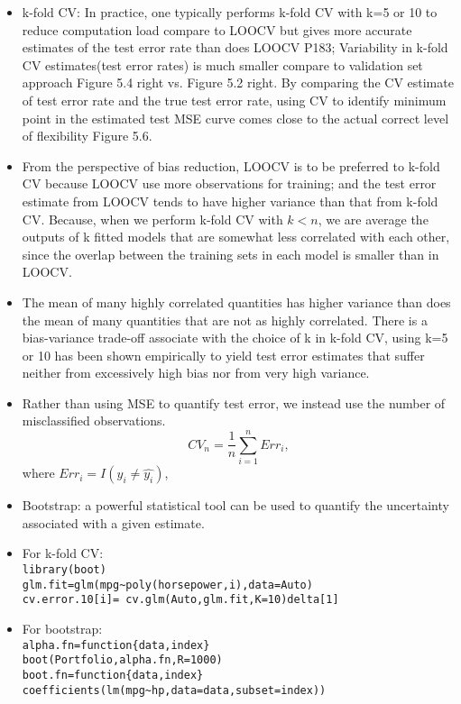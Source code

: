 \documentclass[a4paper, 12pt]{article}
\begin{document}
\begin{itemize}
	\item k-fold CV: In practice, one typically performs k-fold CV with k=5 or 10 to reduce computation load compare to LOOCV but gives more accurate estimates of the test error rate than does LOOCV P183; Variability in k-fold CV estimates(test error rates) is much smaller compare to validation set approach Figure 5.4 right vs. Figure 5.2 right. By comparing the CV estimate of test error rate and the true test error rate, using CV to identify minimum point in the estimated test MSE curve comes close to the actual correct level of flexibility Figure 5.6.
	\item From the perspective of bias reduction, LOOCV is to be preferred to k-fold CV because LOOCV use more observations for training; and the test error estimate from LOOCV tends to have higher variance than that from k-fold CV. Because, when we perform k-fold CV with $k<n$, we are average the outputs of k fitted models that are somewhat less correlated with each other, since the overlap between the training sets in each model is smaller than in LOOCV.
	\item The mean of many highly correlated quantities has higher variance than does the mean of many quantities that are not as highly correlated. There is a bias-variance trade-off associate with the choice of k in k-fold CV, using k=5 or 10 has been shown empirically to yield test error estimates that suffer neither from excessively high bias nor from very high variance.
	\item Rather than using MSE to quantify test error, we instead use the number of misclassified observations.\[
	CV_{n}=\frac{1}{n}\sum_{i=1}^{n}Err_i,
	\] 
	where $Err_i=I(y_i\ne \hat{y_i})$, 
	
	\item Bootstrap: a powerful statistical tool can be used to quantify the uncertainty associated with a given estimate.
	\item For k-fold CV: \\ \verb|library(boot)|\\  \verb|glm.fit=glm(mpg~poly(horsepower,i),data=Auto)|\\
	\verb|cv.error.10[i]= cv.glm(Auto,glm.fit,K=10)delta[1]|
	
	\item For bootstrap:\\ \verb|alpha.fn=function{data,index}|\\  \verb|boot(Portfolio,alpha.fn,R=1000)|\\
	\verb|boot.fn=function{data,index} coefficients(lm(mpg~hp,data=data,subset=index))|
	
\end{itemize}
\end{document}
